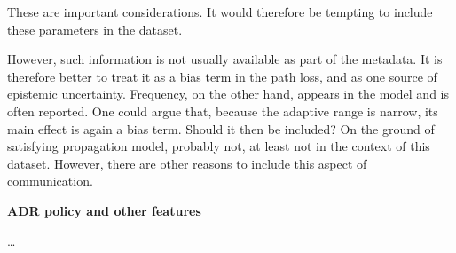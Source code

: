 \documentclass[11pt]{article}
\begin{document}
These are important considerations. It would therefore be tempting to include these parameters in the dataset.

However, such information is not usually available as part of the metadata. It is therefore better to treat it as a bias term in the path loss, and as one source of epistemic uncertainty. Frequency, on the other hand, appears in the model and is often reported. One could argue that, because the adaptive range is narrow, its main effect is again a bias term. Should it then be included? On the ground of satisfying propagation model, probably not, at least not in the context of this dataset. However, there are other reasons to include this aspect of communication.

\textbf{ADR policy and other features}

\ldots{}
\end{document}
